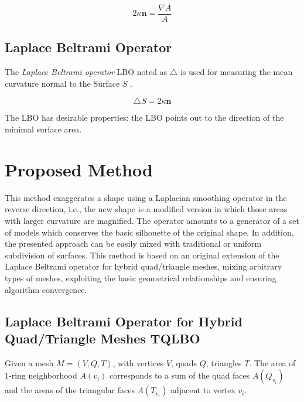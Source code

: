 \documentclass[10pt, conference]{IEEEtran}
\begin{document}
\begin{equation}
2\kappa\mathbf{n}=\frac{\nabla A}{A}\label{eq:discrete_mean_curvature_normal}
\end{equation}



\subsection{Laplace Beltrami Operator}

The \textit{Laplace Beltrami operator} LBO noted as $\triangle$
is used for measuring the mean curvature normal to the Surface $S$
\cite{Pinkall1993}. 

\begin{equation}
\triangle S=2\kappa\mathbf{n}\label{eq:def_LBO}
\end{equation}


The LBO has desirable properties: the LBO points out to the direction
of the minimal surface area.


\section{Proposed Method\label{sec:Proposed-Method}}

This method exaggerates a shape using a Laplacian smoothing operator
in the reverse direction, i.e., the new shape is a modified version
in which those areas with larger curvature are magnified. The operator
amounts to a generator of a set of models which conserves the basic
silhouette of the original shape. In addition, the presented approach
can be easily mixed with traditional or uniform subdivision of surfaces.
This method is based on an original extension of the Laplace Beltrami
operator for hybrid quad/triangle meshes, mixing arbitrary types of
meshes, exploiting the basic geometrical relationships and ensuring
algorithm convergence. 


\subsection{Laplace Beltrami Operator for Hybrid Quad/Triangle Meshes TQLBO\label{sub:Laplace-Beltrami-operator}}

Given a mesh $M=\left(V,Q,T\right)$, with vertices $V$, quads $Q$,
triangles $T$. The area of $1$-ring neighborhood $A\left(v_{i}\right)$
corresponds to a sum of the quad faces $A\left(Q_{v_{i}}\right)$
and the areas of the triangular faces $\ensuremath{A\left(T_{v_{i}}\right)}$
adjacent to vertex $\ensuremath{v_{i}}$.
\end{document}
